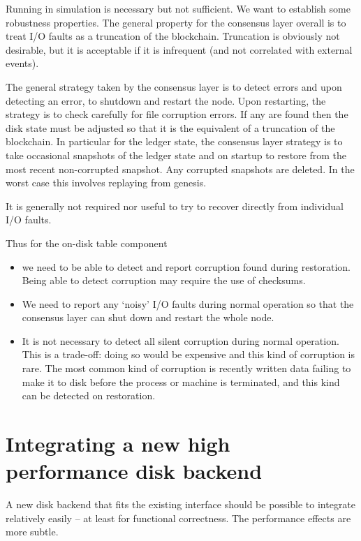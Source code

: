 \documentclass[11pt,a4paper]{article}
\begin{document}
Running in simulation is necessary but not sufficient. We want to establish
some robustness properties. The general property for the consensus layer
overall is to treat I/O faults as a truncation of the blockchain. Truncation is
obviously not desirable, but it is acceptable if it is infrequent (and not
correlated with external events).

The general strategy taken by the consensus layer is to detect errors and upon
detecting an error, to shutdown and restart the node. Upon restarting, the
strategy is to check carefully for file corruption errors. If any are found
then the disk state must be adjusted so that it is the equivalent of a
truncation of the blockchain. In particular for the ledger state, the consensus
layer strategy is to take occasional snapshots of the ledger state and on
startup to restore from the most recent non-corrupted snapshot. Any corrupted
snapshots are deleted. In the worst case this involves replaying from genesis.

It is generally not required nor useful to try to recover directly from
individual I/O faults.

Thus for the on-disk table component
\begin{itemize}
\item we need to be able to detect and report corruption found during
      restoration. Being able to detect corruption may require the use of
      checksums.
\item We need to report any `noisy' I/O faults during normal operation so that
      the consensus layer can shut down and restart the whole node.
\item It is not necessary to detect all silent corruption during normal
      operation. This is a trade-off: doing so would be expensive and this kind
      of corruption is rare. The most common kind of corruption is recently
      written data failing to make it to disk before the process or machine is
      terminated, and this kind can be detected on restoration.
\end{itemize}

\section{Integrating a new high performance disk backend}

A new disk backend that fits the existing interface should be possible to
integrate relatively easily -- at least for functional correctness. The
performance effects are more subtle.
\end{document}
